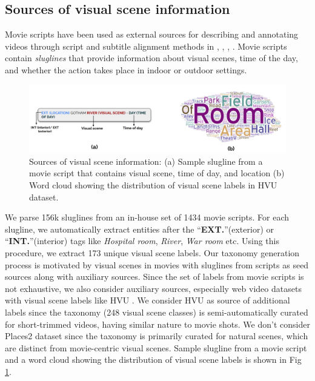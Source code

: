 \subsection{Sources of visual scene information}
Movie scripts have been used as external sources for describing and annotating videos through script and subtitle alignment methods in \cite{10.1007/978-3-540-88693-8_12}, \cite{Everingham2006HelloMN}, \cite{Laptevactionscvpr}, \cite{Rohrbach2015ADF}. Movie scripts contain \textit{sluglines} that provide information about visual scenes, time of the day, and whether the action takes place in indoor or outdoor settings.

\begin{figure}[!h]
 \centering
  \includegraphics[width=\linewidth]{figures/sources_of_information_visual_scene_taxonomy.png}
  \caption{Sources of visual scene information: (a) Sample slugline from a movie script that contains visual scene, time of day, and location (b) Word cloud showing the distribution of visual scene labels in HVU \cite{diba_large_2020} dataset.}
  \label{sources of information}
\end{figure}

We parse 156k sluglines from an in-house set of 1434 movie scripts. For each slugline, we automatically extract entities after the ``\textbf{EXT.}''(exterior) or ``\textbf{INT.}''(interior) tags like \textit{Hospital room}, \textit{River}, \textit{War room} etc.
Using this procedure, we extract 173 unique visual scene labels. Our taxonomy generation process is motivated by visual scenes in movies with sluglines from scripts as seed sources along with auxiliary sources.
Since the set of labels from movie scripts is not exhaustive, we also consider auxiliary sources, especially web video datasets with visual scene labels like HVU \cite{diba_large_2020}. We consider HVU as source of additional labels since the taxonomy (248 visual scene classes) is semi-automatically curated for short-trimmed videos, having similar nature to movie shots. We don’t consider Places2 \cite{zhou2017places} dataset since the taxonomy is primarily curated for natural
scenes, which are distinct from movie-centric visual scenes. Sample slugline from a movie script and a word cloud showing the distribution of visual scene labels is shown in Fig \ref{sources of information}.

